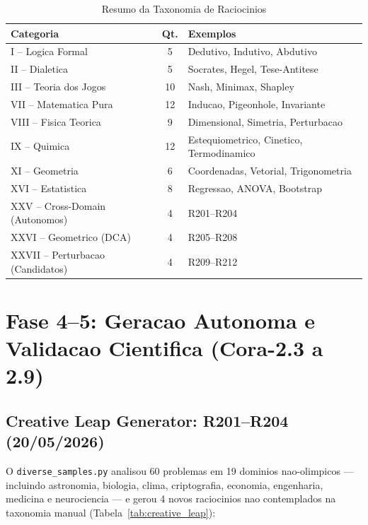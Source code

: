 \documentclass[5p]{elsarticle}
\newcommand{\tabfootnotesize}{\fontsize{9}{11}\selectfont}
\begin{document}
\begin{table}[H]
\centering
\caption{Resumo da Taxonomia de Raciocinios}
\label{tab:taxonomia_resumo}
\tabfootnotesize
\begin{tabular}{l c l}
\toprule
\textbf{Categoria} & \textbf{Qt.} & \textbf{Exemplos}\\
\midrule
I -- Logica Formal & 5 & Dedutivo, Indutivo, Abdutivo\\
II -- Dialetica & 5 & Socrates, Hegel, Tese-Antitese\\
III -- Teoria dos Jogos & 10 & Nash, Minimax, Shapley\\
VII -- Matematica Pura & 12 & Inducao, Pigeonhole, Invariante\\
VIII -- Fisica Teorica & 9 & Dimensional, Simetria, Perturbacao\\
IX -- Quimica & 12 & Estequiometrico, Cinetico, Termodinamico\\
XI -- Geometria & 6 & Coordenadas, Vetorial, Trigonometria\\
XVI -- Estatistica & 8 & Regressao, ANOVA, Bootstrap\\
XXV -- Cross-Domain (Autonomos) & 4 & R201--R204\\
XXVI -- Geometrico (DCA) & 4 & R205--R208\\
XXVII -- Perturbacao (Candidatos) & 4 & R209--R212\\
\bottomrule
\end{tabular}
\end{table}

\section{Fase 4--5: Geracao Autonoma e Validacao Cientifica (Cora-2.3 a 2.9)}

\subsection{Creative Leap Generator: R201--R204 (20/05/2026)}

O \texttt{diverse\_samples.py} analisou 60 problemas em 19 dominios nao-olimpicos
--- incluindo astronomia, biologia, clima, criptografia, economia, engenharia,
medicina e neurociencia --- e gerou 4 novos raciocinios nao contemplados na
taxonomia manual (Tabela~\ref{tab:creative_leap}):
\end{document}
